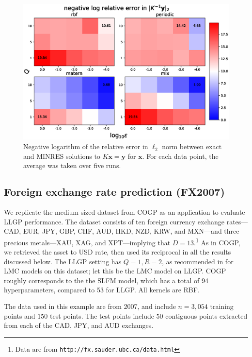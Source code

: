 \documentclass{article}
\def\Tx{\textbf{x}}
\def\Ty{\textbf{y}}
\begin{document}
\begin{figure}[!ht]
\vskip 0.2in
\begin{center}
\centerline{\includegraphics[width=\columnwidth]{relalpha_l2.eps}}
\caption{Negative logarithm of the relative error in $\ell_2$ norm between exact and MINRES solutions to $K\Tx=\Ty$ for $\Tx$. For each data point, the average was taken over five runs.}
\label{fig:inverr}
\end{center}
\vskip -0.2in
\end{figure}

\subsection{Foreign exchange rate prediction (FX2007)}\label{fx2007-results}

We replicate the medium-sized dataset from COGP as an application to evaluate LLGP performance. The dataset consists of ten foreign currency exchange rates---CAD, EUR, JPY, GBP, CHF, AUD, HKD, NZD, KRW, and MXN---and three precious metals---XAU, XAG, and XPT---implying that $D=13$.\footnote{Data are from \texttt{http://fx.sauder.ubc.ca/data.html}} As in COGP, we retrieved the asset to USD rate, then used its reciprocal in all the results discussed below. The LLGP setting has $Q=1,R=2$, as recommended in \cite{alvarez2010efficient} for LMC models on this dataset; let this be the LMC model on LLGP. COGP roughly corresponds to the the SLFM model, which has a total of 94 hyperparameters, compared to 53 for LLGP. All kernels are RBF.

The data used in this example are from 2007, and include $n=3,054$ training points and $150$ test points. The test points include 50 contiguous points extracted from each of the CAD, JPY, and AUD exchanges.
\end{document}
